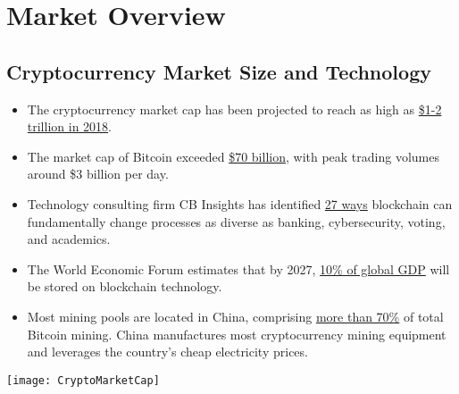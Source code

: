 \documentclass[11pt,fleqn,oneside]{book} %
\begin{document}
\section{Market Overview}
	\subsection{Cryptocurrency Market Size and Technology}
		\begin{itemize}
			\item The cryptocurrency market cap has been projected to reach as high as 
			\href{https://www.ccn.com/cryptocurrency-market-cap-to-reach-2-trillion-in-2018-mike-novogratz/}{\$1-2 trillion in 2018}.
			\item The market cap of Bitcoin exceeded \href{https://coinmarketcap.com/currencies/bitcoin/historical-data/}{\$70 billion}, 
			with peak trading volumes around \$3 billion per day.
			\item Technology consulting firm CB Insights has identified \href{https://www.cbinsights.com/blog/industries-disrupted-blockchain/}{27 ways} 
			blockchain can fundamentally change processes as diverse as banking, cybersecurity, voting, and academics.
			\item The World Economic Forum estimates that by 2027, 
			\href{http://www3.weforum.org/docs/WEF_GAC15_Technological_Tipping_Points_report_2015.pdf}{10\% of global GDP} will be stored on blockchain technology.
			\item Most mining pools are located in China, comprising \href{https://www.buybitcoinworldwide.com/mining/china/}{more than 70\%} 
			of total Bitcoin mining. China manufactures most cryptocurrency mining equipment and leverages the country’s cheap electricity prices.
		\end{itemize}
		\begin{center}
			\texttt{[image: CryptoMarketCap]}
		\end{center}
\end{document}
